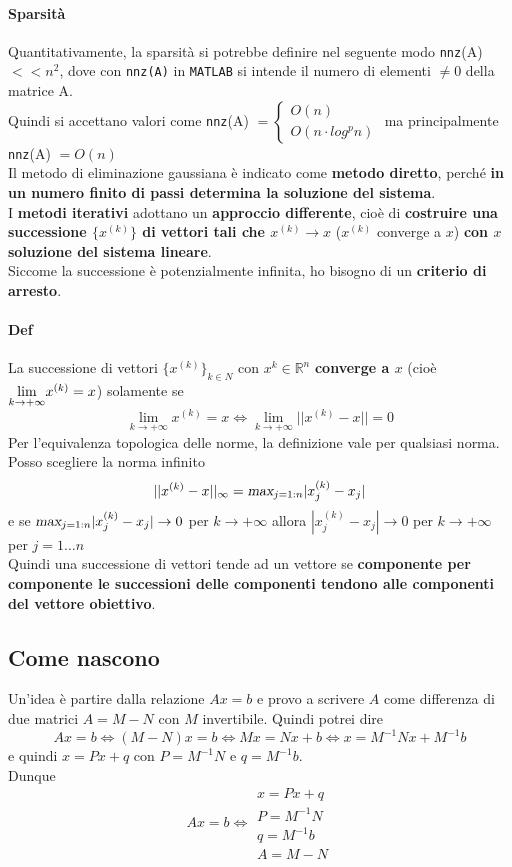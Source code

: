 \documentclass[10pt]{book}
\begin{document}
\paragraph{Sparsità} Quantitativamente, la sparsità si potrebbe definire nel seguente modo \texttt{nnz}(A) $<< n^2$, dove con \texttt{nnz(A)} in \texttt{MATLAB} si intende il numero di elementi $\neq 0$ della matrice A.\\
Quindi si accettano valori come \texttt{nnz}(A) $= \left\{ \begin{array}{l}O(n) \\ O(n\cdot log^p n) \end{array} \right. $ ma principalmente \texttt{nnz}(A) $= O(n)$\\

Il metodo di eliminazione gaussiana è indicato come \textbf{metodo diretto}, perché \textbf{in un numero finito di passi determina la soluzione del sistema}.\\
I \textbf{metodi iterativi} adottano un \textbf{approccio differente}, cioè di \textbf{costruire una successione $\{x^{(k)}\}$ di vettori tali che $x^{(k)} \rightarrow x$} ($x^{(k)}$ converge a $x$) \textbf{con $x$ soluzione del sistema lineare}.\\
Siccome la successione è potenzialmente infinita, ho bisogno di un \textbf{criterio di arresto}.
\paragraph{Def} La successione di vettori $\{x^{(k)}\}_{k\in N}$ con $x^{k} \in \mathbb{R}^n$ \textbf{converge a $x$} (cioè $\mathlarger{\lim_{k\to +\infty}} x^{(k)} = x$) solamente se
$$\lim_{k\to +\infty} x^{(k)} = x \Leftrightarrow \lim_{k\to +\infty} ||x^{(k)} - x|| = 0$$
Per l'equivalenza topologica delle norme, la definizione  vale per qualsiasi norma. Posso scegliere la norma infinito 
$$||x^{(k)} - x||_\infty = \textsl{max}_{j=1:n}|x_j^{(k)} - x_j|$$
e se $\textsl{max}_{j=1:n}|x_j^{(k)} - x_j| \rightarrow 0$ per $k \rightarrow +\infty$ allora $|x_j^{(k)} - x_j| \rightarrow 0$ per $k \rightarrow +\infty$ per $j = 1\ldots n$\\
Quindi una successione di vettori tende ad un vettore se \textbf{componente per componente le successioni delle componenti tendono alle componenti del vettore obiettivo}.
\subsection{Come nascono}
Un'idea è partire dalla relazione $Ax = b$ e provo a scrivere $A$ come differenza di due matrici $A = M - N$ con $M$ invertibile. Quindi potrei dire $$Ax = b \Leftrightarrow (M - N)x = b \Leftrightarrow Mx = Nx + b \Leftrightarrow x = M^{-1}Nx + M^{-1}b$$ e quindi $x = Px + q$ con $P = M^{-1}N$ e $q = M^{-1}b$.\\
Dunque $$Ax = b \Leftrightarrow \begin{array}{l}
x = Px + q \\
P = M^{-1}N\\q = M^{-1}b\\
A = M - N
\end{array}$$
\end{document}

